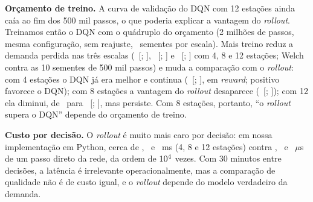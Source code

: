 \documentclass[12pt,a4paper]{article}
\begin{document}
\textbf{Or\c{c}amento de treino.} A curva de valida\c{c}\~ao do DQN com 12 esta\c{c}\~oes ainda caía ao fim dos 500 mil passos, o que poderia explicar a vantagem do
\emph{rollout}. Treinamos ent\~ao o DQN com o qu\'adruplo do or\c{c}amento (2 milh\~oes de passos, mesma configura\c{c}\~ao, sem reajuste, \bdgNA\ sementes por escala).
Mais treino reduz a demanda perdida nas tr\^es escalas (\bdgDeltaA\ [\bdgDeltaLoA; \bdgDeltaHiA], \bdgDeltaB\ [\bdgDeltaLoB; \bdgDeltaHiB] e \bdgDeltaC\
[\bdgDeltaLoC; \bdgDeltaHiC] com 4, 8 e 12 esta\c{c}\~oes; Welch contra as 10 sementes de 500 mil passos) e muda a compara\c{c}\~ao com o \emph{rollout}: com 4
esta\c{c}\~oes o DQN j\'a era melhor e continua (\bdgVsRollA\ [\bdgVsRollLoA; \bdgVsRollHiA], em \emph{reward}; positivo favorece o DQN); com 8 esta\c{c}\~oes a
vantagem do \emph{rollout} desaparece (\bdgVsRollB\ [\bdgVsRollLoB; \bdgVsRollHiB]); com 12 ela diminui, de \bdgGapC\ para \bdgVsRollC\ [\bdgVsRollLoC;
\bdgVsRollHiC], mas persiste. Com 8 esta\c{c}\~oes, portanto, ``o \emph{rollout} supera o DQN'' depende do or\c{c}amento de treino.

\textbf{Custo por decis\~ao.} O \emph{rollout} \'e muito mais caro por decis\~ao: em nossa implementa\c{c}\~ao em Python, cerca de \latRollA, \latRollB\ e \latRollC\ ms
(4, 8 e 12 esta\c{c}\~oes) contra \latNetA, \latNetB\ e \latNetC\ $\mu$s de um passo direto da rede, da ordem de $10^{4}$ vezes. Com 30 minutos entre
decis\~oes, a lat\^encia \'e irrelevante operacionalmente, mas a compara\c{c}\~ao de qualidade n\~ao \'e de custo igual, e o \emph{rollout} depende do modelo
verdadeiro da demanda.
\end{document}
